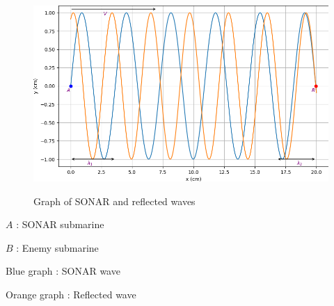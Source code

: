 \documentclass[journal,12pt,onecolumn]{IEEEtran}
\theoremstyle{remark}
\begin{document}
\begin{figure}[h]
    \centering
    \includegraphics[width=\columnwidth]{figs/fig1.png}\\
    \caption{Graph of SONAR and reflected waves}
    \label{tab:11.15.25.1}
\end{figure}

\vspace{0.1cm}
	
	$A$ : SONAR submarine

	$B$ : Enemy submarine
	
	Blue graph : SONAR wave

	Orange  graph : Reflected wave
\end{document}
